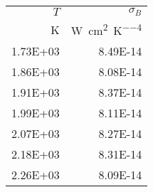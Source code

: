 \begin{table}[H]
\begin{tabular}{rr}
\toprule
$T$ & $\sigma_B$ \\
\si[]{\kelvin} & \si[]{\watt\per\centi\meter\squared\per\kelvin\tothe{4}} \\
\midrule
1.73E+03 & 8.49E-14 \\
1.86E+03 & 8.08E-14 \\
1.91E+03 & 8.37E-14 \\
1.99E+03 & 8.11E-14 \\
2.07E+03 & 8.27E-14 \\
2.18E+03 & 8.31E-14 \\
2.26E+03 & 8.09E-14 \\
\bottomrule
\end{tabular}
\end{table}
